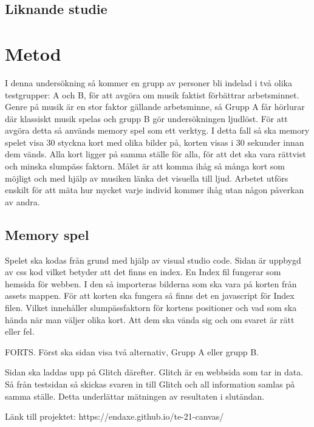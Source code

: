 \documentclass[11p]{article}
\begin{document}
    \subsection{Liknande studie}




    \section{Metod}
    I denna undersökning så kommer en grupp av personer bli indelad i två olika testgrupper: A och B, för att avgöra om musik faktist förbättrar arbetsminnet.
    Genre på musik är en stor faktor gällande arbetsminne, så Grupp A får hörlurar där klassiskt musik spelas och grupp B gör undersökningen ljudlöst.
    \newline För att avgöra detta så används memory spel som ett verktyg.
    I detta fall så ska memory spelet visa 30 styckna kort med olika bilder på, korten visas i 30 sekunder innan dem vänds.
    \newline Alla kort ligger på samma ställe för alla, för att det ska vara rättvist och minska slumpäss faktorn.
    Målet är att komma ihåg så många kort som möjligt och med hjälp av musiken länka det visuella till ljud.
    Arbetet utförs enskilt för att mäta hur mycket varje individ kommer ihåg utan någon påverkan av andra.

    \subsection{Memory spel}
    Spelet ska kodas från grund med hjälp av visual studio code.
    Sidan är uppbygd av css kod vilket betyder att det finns en index.
    En Index fil fungerar som hemsida för webben.
    I den så importeras bilderna som ska vara på korten från assets mappen.
    För att korten ska fungera så finns det en javascript för Index filen.
    Vilket innehåller slumpässfaktorn för kortens positioner och vad som ska hända när man väljer olika kort.
    Att dem ska vända sig och om svaret är rätt eller fel.


    FORTS.
    Först ska sidan visa två alternativ, Grupp A eller grupp B.

    Sidan ska laddas upp på Glitch därefter.
    Glitch är en webbsida som tar in data.
    Så från testsidan så skickas svaren in till Glitch och all information samlas på samma ställe.
    Detta underlättar mätningen av resultaten i slutändan.

    Länk till projektet: https://endaxe.github.io/te-21-canvas/
\end{document}
